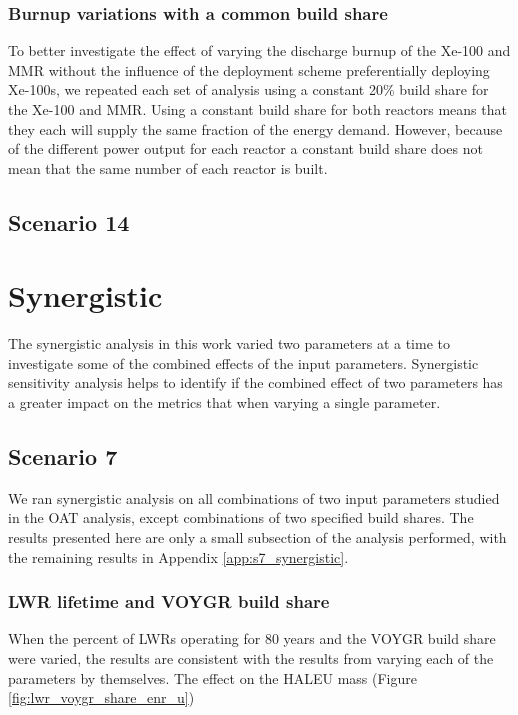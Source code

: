 \subsubsection{Burnup variations with a common build share}
To better investigate the effect of varying the discharge burnup of the Xe-100 
and \gls{MMR} without the influence of the deployment scheme preferentially
deploying Xe-100s, we repeated each set of analysis using a constant 20\% 
build share for the Xe-100 and \gls{MMR}. Using a constant build share for 
both reactors means that they each will supply the same fraction of the energy demand.
However, because of the different power output for each reactor a constant build 
share does not mean that the same number of each reactor is built. 

\subsection{Scenario 14}

\section{Synergistic}
The synergistic analysis in this work varied two parameters at a time to 
investigate some of the combined effects of the input parameters. Synergistic 
sensitivity analysis helps to identify if the combined effect of two parameters 
has a greater impact on the metrics that when varying a single parameter. 

\subsection{Scenario 7}
We ran synergistic 
analysis on all combinations of two input parameters studied in the \gls{OAT} 
analysis, except combinations of two specified build shares. The
results presented here are only a small subsection of the analysis performed, 
with the remaining results in Appendix \ref{app:s7_synergistic}.

\subsubsection{LWR lifetime and VOYGR build share}
When the percent of \glspl{LWR} operating for 80 years and the VOYGR build share 
were varied, the results are consistent with the results from varying 
each of the parameters by themselves. The effect on the \gls{HALEU} mass 
(Figure \ref{fig:lwr_voygr_share_enr_u})

